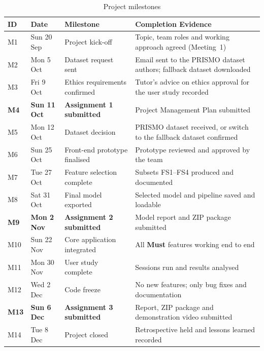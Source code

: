 \begin{table}[htbp]
\centering
\caption{Project milestones}
\label{tab:milestones}
\begin{tabularx}{\textwidth}{@{}l l >{\raggedright\arraybackslash}X >{\raggedright\arraybackslash}p{}@{}}
  \toprule
  \textbf{ID} & \textbf{Date} & \textbf{Milestone} & \textbf{Completion Evidence} \\
  \midrule
  M1  & Sun 20 Sep & Project kick-off & Topic, team roles and working approach agreed (Meeting~1) \\
  M2  & Mon 5 Oct  & Dataset request sent & Email sent to the PRISMO dataset authors; fallback dataset downloaded \\
  M3  & Fri 9 Oct  & Ethics requirements confirmed & Tutor's advice on ethics approval for the user study recorded \\
  \textbf{M4}  & \textbf{Sun 11 Oct} & \textbf{Assignment 1 submitted} & Project Management Plan submitted \\
  M5  & Mon 12 Oct & Dataset decision & PRISMO dataset received, or switch to the fallback dataset confirmed \\
  M6  & Sun 25 Oct & Front-end prototype finalised & Prototype reviewed and approved by the team \\
  M7  & Tue 27 Oct & Feature selection complete & Subsets FS1--FS4 produced and documented \\
  M8  & Sat 31 Oct & Final model exported & Selected model and pipeline saved and loadable \\
  \textbf{M9}  & \textbf{Mon 2 Nov}  & \textbf{Assignment 2 submitted} & Model report and ZIP package submitted \\
  M10 & Sun 22 Nov & Core application integrated & All \textbf{Must} features working end to end \\
  M11 & Mon 30 Nov & User study complete & Sessions run and results analysed \\
  M12 & Wed 2 Dec  & Code freeze & No new features; only bug fixes and documentation \\
  \textbf{M13} & \textbf{Sun 6 Dec}  & \textbf{Assignment 3 submitted} & Report, ZIP package and demonstration video submitted \\
  M14 & Tue 8 Dec  & Project closed & Retrospective held and lessons learned recorded \\
  \bottomrule
\end{tabularx}
\end{table}

